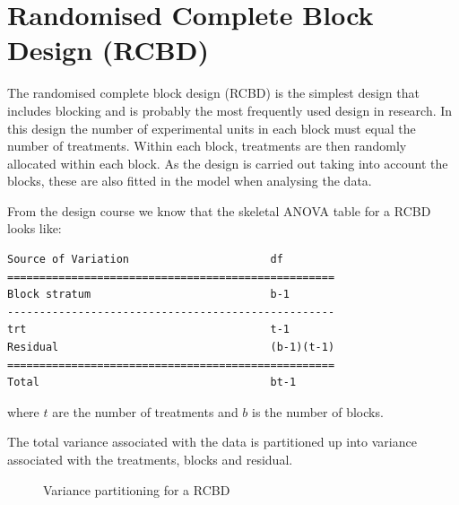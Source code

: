 \documentclass[a4paper, 10pt, fleqn, twosided]{memoir}
\begin{document}
\clearpage



\section{Randomised Complete Block Design (RCBD)}

The randomised complete block design (RCBD) is the simplest design that includes blocking and is probably the most
frequently used design in research. In this design the number of experimental units in each block must equal the number
of treatments. Within each block, treatments are then randomly allocated within each block. As the design is carried
out taking into account the blocks, these are also fitted in the model when analysing the data.

From the design course we know that the skeletal ANOVA table for a RCBD looks like:

\begin{verbatim}
Source of Variation                      df
===================================================
Block stratum                            b-1
---------------------------------------------------
trt                                      t-1
Residual                                 (b-1)(t-1)
===================================================
Total                                    bt-1
\end{verbatim}

where $t$ are the number of treatments and $b$ is the number of blocks.

The total variance associated with the data is partitioned up into variance associated with the treatments, blocks and
residual.


\begin{figure}[!hbtp]
\centering
{}
\caption{Variance partitioning for a RCBD}
\label{fig:rcbdbucket}
\end{figure}
\end{document}
